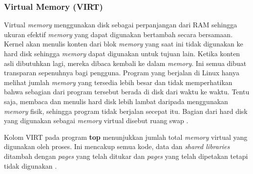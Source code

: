 \subsubsection{Virtual Memory (VIRT)}
Virtual \textit{memory} menggunakan disk sebagai perpanjangan dari RAM sehingga ukuran efektif \textit{memory} yang dapat digunakan bertambah secara bersamaan. Kernel akan menulis konten dari blok \textit{memory} yang saat ini tidak digunakan ke hard disk sehingga \textit{memory} dapat digunakan untuk tujuan lain. Ketika konten asli dibutuhkan lagi, mereka dibaca kembali ke dalam \textit{memory}. Ini semua dibuat transparan sepenuhnya bagi pengguna. Program yang berjalan di Linux hanya melihat jumlah \textit{memory} yang tersedia lebih besar dan tidak memperhatikan bahwa sebagian dari program tersebut berada di disk dari waktu ke waktu. Tentu saja, membaca dan menulis hard disk lebih lambat daripada menggunakan \textit{memory} fisik, sehingga program tidak berjalan secepat itu. Bagian dari hard disk yang digunakan sebagai \textit{memory} virtual disebut ruang swap \cite{site:ltdp}.


Kolom VIRT pada program \textbf{top} menunjukkan jumlah total \textit{memory} virtual yang digunakan oleh proses. Ini mencakup semua kode, data dan \textit{shared  libraries} ditambah dengan \textit{pages} yang telah ditukar dan \textit{pages} yang telah dipetakan tetapi tidak digunakan \cite{manual:linux}. 


